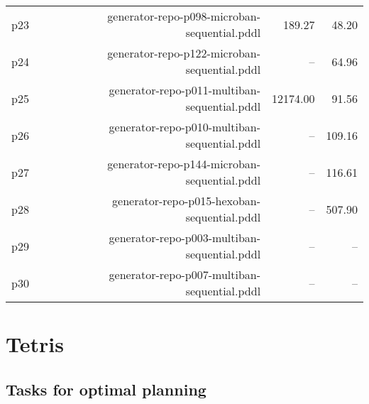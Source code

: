 \documentclass{article}
\begin{document}
\begin{center}
\begin{tabular}{@{}l|r|r|r@{}}
  p23& generator-repo-p098-microban-sequential.pddl&189.27&48.20\\
  p24& generator-repo-p122-microban-sequential.pddl&--&64.96\\
  p25& generator-repo-p011-multiban-sequential.pddl&12174.00&91.56\\
  p26& generator-repo-p010-multiban-sequential.pddl&--&109.16\\
  p27& generator-repo-p144-microban-sequential.pddl&--&116.61\\
  p28& generator-repo-p015-hexoban-sequential.pddl&--&507.90\\
  p29& generator-repo-p003-multiban-sequential.pddl&--&--\\
  p30& generator-repo-p007-multiban-sequential.pddl&--&--
                            \end{tabular}
                            \end{center}
                    
                \newpage \section{Tetris}
                    \subsection*{Tasks for optimal planning}
                    
\end{document}
